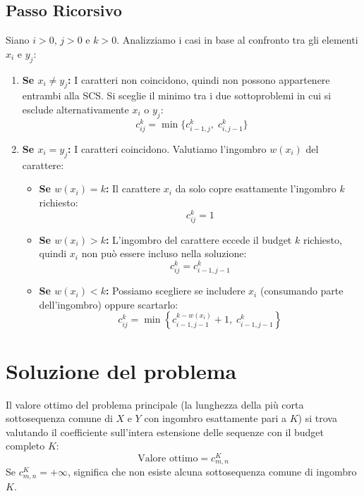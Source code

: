 \subsection{Passo Ricorsivo}
Siano $i > 0$, $j > 0$ e $k > 0$. Analizziamo i casi in base al confronto tra gli elementi $x_i$ e $y_j$:
\begin{enumerate}
    \item \textbf{Se $x_i \neq y_j$:} I caratteri non coincidono, quindi non possono appartenere entrambi alla SCS. Si sceglie il minimo tra i due sottoproblemi in cui si esclude alternativamente $x_i$ o $y_j$:
    \begin{equation*}
        c_{ij}^k = \min\{c_{i-1, j}^k, \; c_{i, j-1}^k\}
    \end{equation*}
    
    \item \textbf{Se $x_i = y_j$:} I caratteri coincidono. Valutiamo l'ingombro $w(x_i)$ del carattere:
    \begin{itemize}
        \item \textbf{Se $w(x_i) = k$:} Il carattere $x_i$ da solo copre esattamente l'ingombro $k$ richiesto:
        \begin{equation*}
            c_{ij}^k = 1
        \end{equation*}
        \item \textbf{Se $w(x_i) > k$:} L'ingombro del carattere eccede il budget $k$ richiesto, quindi $x_i$ non può essere incluso nella soluzione:
        \begin{equation*}
            c_{ij}^k = c_{i-1, j-1}^k
        \end{equation*}
        \item \textbf{Se $w(x_i) < k$:} Possiamo scegliere se includere $x_i$ (consumando parte dell'ingombro) oppure scartarlo:
        \begin{equation*}
            c_{ij}^k = \min\left\{c_{i-1, j-1}^{k - w(x_i)} + 1, \; c_{i-1, j-1}^k\right\}
        \end{equation*}
    \end{itemize}
\end{enumerate}

\section{Soluzione del problema}
Il valore ottimo del problema principale (la lunghezza della più corta sottosequenza comune di $X$ e $Y$ con ingombro esattamente pari a $K$) si trova valutando il coefficiente sull'intera estensione delle sequenze con il budget completo $K$:
\begin{equation*}
    \text{Valore ottimo} = c_{m,n}^K
\end{equation*}
Se $c_{m,n}^K = +\infty$, significa che non esiste alcuna sottosequenza comune di ingombro $K$.

